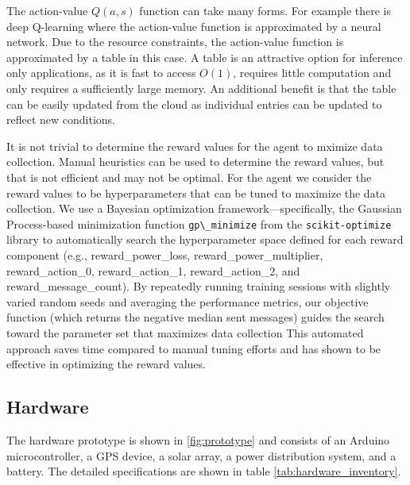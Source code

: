 \documentclass[10pt]{cai}
\begin{document}
The action-value $Q(a,s)$ function can take many forms. 
For example there is deep Q-learning where the action-value function is approximated by a neural network.
Due to the resource constraints, the action-value function is approximated by a table in this case.
A table is an attractive option for inference only applications, as it is fast to access $O(1)$, requires little computation and only requires a sufficiently large memory.
An additional benefit is that the table can be easily updated from the cloud as individual entries can be updated to reflect new conditions.


It is not trivial to determine the reward values for the agent to mximize data collection.
Manual heuristics can be used to determine the reward values, but that is not efficient and may not be optimal.
For the agent we consider the reward values to be hyperparameters that can be tuned to maximize the data collection.
We use a Bayesian optimization framework—specifically, the Gaussian Process-based minimization function \verb|gp\_minimize| from the \verb|scikit-optimize| library to automatically search the hyperparameter space defined for each reward component (e.g., reward\_power\_loss, reward\_power\_multiplier, reward\_action\_0, reward\_action\_1, reward\_action\_2, and reward\_message\_count).
By repeatedly running training sessions with slightly varied random seeds and averaging the performance metrics, our objective function (which returns the negative median sent messages) guides the search toward the parameter set that maximizes data collection
This automated approach saves time compared to manual tuning efforts and has shown to be effective in optimizing the reward values.

\subsection{Hardware}
The hardware prototype is shown in \ref{fig:prototype} and consists of an Arduino microcontroller, a GPS device,  a solar array, a power distribution system, and a battery.
The detailed specifications are shown in table \ref{tab:hardware_inventory}.
\end{document}
